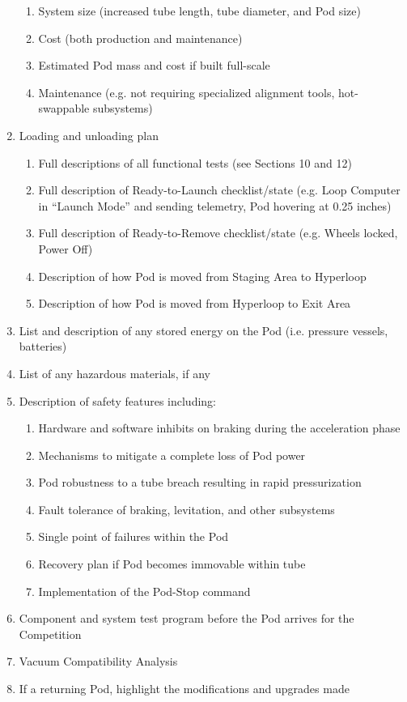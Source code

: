 \documentclass{report}
\begin{document}
\begin{enumerate}
\begin{enumerate}
            \item System size (increased tube length, tube diameter, and Pod size)
            \item Cost (both production and maintenance)
            \item Estimated Pod mass and cost if built full-scale
            \item Maintenance (e.g. not requiring specialized alignment tools, hot-swappable subsystems)
        \end{enumerate}
        \item Loading and unloading plan
        \begin{enumerate}
            \item Full descriptions of all functional tests (see Sections 10 and 12)
            \item Full description of Ready-to-Launch checklist/state (e.g. Loop Computer in “Launch Mode” and sending telemetry, Pod hovering at 0.25 inches)
            \item Full description of Ready-to-Remove checklist/state (e.g. Wheels locked, Power Off)
            \item Description of how Pod is moved from Staging Area to Hyperloop
            \item Description of how Pod is moved from Hyperloop to Exit Area
        \end{enumerate}
        \item List and description of any stored energy on the Pod (i.e. pressure vessels, batteries)
        \item List of any hazardous materials, if any
        \item Description of safety features including:
        \begin{enumerate}
            \item Hardware and software inhibits on braking during the acceleration phase
            \item Mechanisms to mitigate a complete loss of Pod power
            \item Pod robustness to a tube breach resulting in rapid pressurization
            \item Fault tolerance of braking, levitation, and other subsystems
            \item Single point of failures within the Pod
            \item Recovery plan if Pod becomes immovable within tube
            \item Implementation of the Pod-Stop command
        \end{enumerate}
        \item Component and system test program before the Pod arrives for the Competition
        \item Vacuum Compatibility Analysis
        \item If a returning Pod, highlight the modifications and upgrades made
    \end{enumerate}
    
\end{document}

